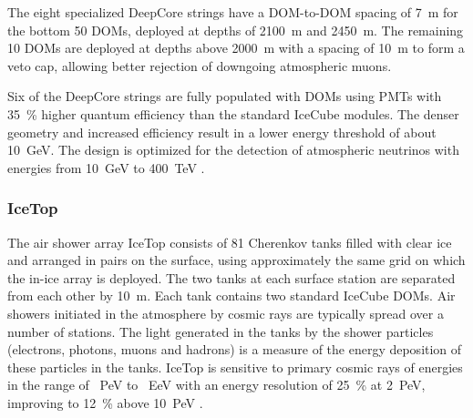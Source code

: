 The eight specialized DeepCore strings have a DOM-to-DOM spacing of
\SI{7}{\meter} for the bottom 50 DOMs, deployed at depths of
\SI{2100}{\meter} and \SI{2450}{\meter}.  The remaining 10 DOMs are
deployed at depths above \SI{2000}{\meter} with a spacing of
\SI{10}{\meter} to form a veto cap, allowing better rejection of downgoing
atmospheric muons.

Six of the DeepCore strings are fully populated with
DOMs using PMTs with \SI{35}{\%} higher quantum efficiency than the
standard IceCube modules.  The denser geometry and increased efficiency
result in a lower energy threshold of about \SI{10}{\giga\electronvolt}.  The design
is optimized for the detection of atmospheric neutrinos with energies
from \SI{10}{\giga\electronvolt} to \SI{400}{\tera\electronvolt}
\cite{ICECUBE:AtmNu}. 


\subsubsection{IceTop}

The air shower array IceTop \cite{ICECUBE:IceTop} consists of \num{81}
Cherenkov tanks filled with clear ice and arranged in pairs on the
surface, using approximately the same grid on which the in-ice
array is deployed.  The two tanks at each surface station are separated from
each other by \SI{10}{\meter}. Each tank contains two standard IceCube
DOMs. Air showers initiated in the atmosphere by cosmic rays are typically
spread over a number of stations. The light generated in the tanks by the
shower particles (electrons, photons, muons and hadrons) is a measure of
the energy deposition of these particles in the tanks. IceTop is sensitive to
primary cosmic rays of energies in the range of \SI{}{PeV} to \SI{}{EeV}
with an energy resolution of \SI{25}{\%} at \SI{2}{PeV}, improving to
\SI{12}{\%} above \SI{10}{PeV} \cite{IT:measurement}.




